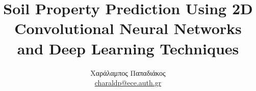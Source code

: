 \documentclass[a4paper,12pt]{report}
\def\tl{\textlatin}
\begin{document}


\title{\tl{Soil Property Prediction Using 2D Convolutional Neural Networks and Deep Learning Techniques}}
\author{Χαράλαμπος Παπαδιάκος \\
\href{mailto:charaldp@ece.auth.gr}{\tl{charaldp@ece.auth.gr}}}
\maketitle

\tableofcontents
\thispagestyle{empty}








\appendix





\end{document}
